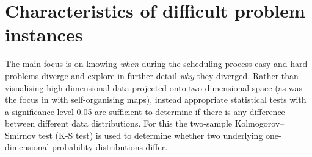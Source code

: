 \section{Characteristics of difficult problem instances}

The main focus is on knowing \emph{when} during the scheduling process easy and hard problems diverge and explore in further detail \emph{why} they diverged. Rather than visualising high-dimensional data projected onto two dimensional space (as was the focus in \cite{SmithMilesLion5} with self-organising maps), instead appropriate statistical tests with a significance level 0.05 are sufficient to determine if there is any difference between different data distributions. For this the two-sample Kolmogorov–Smirnov test (K-S test) is used to determine whether two underlying one-dimensional probability distributions differ. 

